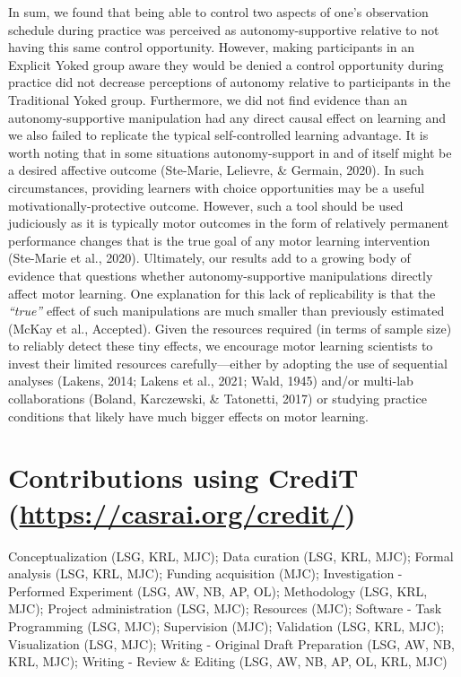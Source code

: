 \documentclass[
  english,
  doc, donotrepeattitle,floatsintext]{apa7}
\begin{document}
In sum, we found that being able to control two aspects of one's observation schedule during practice was perceived as autonomy-supportive relative to not having this same control opportunity. However, making participants in an Explicit Yoked group aware they would be denied a control opportunity during practice did not decrease perceptions of autonomy relative to participants in the Traditional Yoked group. Furthermore, we did not find evidence than an autonomy-supportive manipulation had any direct causal effect on learning and we also failed to replicate the typical self-controlled learning advantage. It is worth noting that in some situations autonomy-support in and of itself might be a desired affective outcome (Ste-Marie, Lelievre, \& Germain, 2020). In such circumstances, providing learners with choice opportunities may be a useful motivationally-protective outcome. However, such a tool should be used judiciously as it is typically motor outcomes in the form of relatively permanent performance changes that is the true goal of any motor learning intervention (Ste-Marie et al., 2020). Ultimately, our results add to a growing body of evidence that questions whether autonomy-supportive manipulations directly affect motor learning. One explanation for this lack of replicability is that the \emph{``true''} effect of such manipulations are much smaller than previously estimated (McKay et al., Accepted). Given the resources required (in terms of sample size) to reliably detect these tiny effects, we encourage motor learning scientists to invest their limited resources carefully---either by adopting the use of sequential analyses (Lakens, 2014; Lakens et al., 2021; Wald, 1945) and/or multi-lab collaborations (Boland, Karczewski, \& Tatonetti, 2017) or studying practice conditions that likely have much bigger effects on motor learning.

\vfill

\hypertarget{contributions-using-credit-httpscasrai.orgcredit}{%
\section{\texorpdfstring{Contributions using CrediT (\url{https://casrai.org/credit/})}{Contributions using CrediT (https://casrai.org/credit/)}}\label{contributions-using-credit-httpscasrai.orgcredit}}

Conceptualization (LSG, KRL, MJC); Data curation (LSG, KRL, MJC); Formal analysis (LSG, KRL, MJC); Funding acquisition (MJC); Investigation - Performed Experiment (LSG, AW, NB, AP, OL); Methodology (LSG, KRL, MJC); Project administration (LSG, MJC); Resources (MJC); Software - Task Programming (LSG, MJC); Supervision (MJC); Validation (LSG, KRL, MJC); Visualization (LSG, MJC); Writing - Original Draft Preparation (LSG, AW, NB, KRL, MJC); Writing - Review \& Editing (LSG, AW, NB, AP, OL, KRL, MJC)
\end{document}
